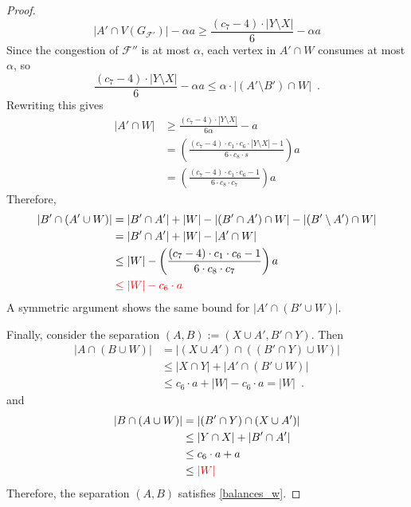 \documentclass{patmorin}
\begin{document}
\begin{proof}
  \[
    |A'\cap V(G_{\mathcal{F}'})| - \alpha a
    \ge \frac{(c_7-4)\cdot |Y\setminus X|}{6} - \alpha a
  \]
  Since the congestion of $\mathcal{F}''$ is at most $\alpha$, each vertex in $A'\cap W$ consumes at most $\alpha$, so
  \[
    \frac{(c_7-4)\cdot |Y\setminus X|}{6} - \alpha a \le \alpha\cdot|(A'\setminus B')\cap W| \enspace .
  \]
  Rewriting this gives
  \begin{align*}
   |A'\cap W|
    & \ge \frac{(c_7-4)\cdot |Y\setminus X|}{6\alpha} - a \\
    & = \left(\frac{(c_7-4)\cdot c_1\cdot c_6\cdot|Y\setminus X|-1}{6\cdot c_8\cdot s}\right)a \\
    & = \left(\frac{(c_7-4)\cdot c_1\cdot c_6-1}{6\cdot c_8\cdot c_7}\right)a
  \end{align*}
  Therefore,
  \begin{align*}
    |B'\cap (A'\cup W)|
    & =  |B'\cap A'| + |W|-|(B'\cap A')\cap W|-|(B'\setminus A')\cap W| \\
    & =  |B'\cap A'| + |W|-|A'\cap W| \\
    & \le |W|- \left(\frac{(c_7-4)\cdot c_1\cdot c_6-1}{6\cdot c_8\cdot c_7}\right)a \\
    & \mathcolor{red}{\le |W|-c_6\cdot a}
  \end{align*}
  A symmetric argument shows the same bound for $|A'\cap (B'\cup W)|$.

  Finally, consider the separation $(A,B):=(X\cup A',B'\cap Y)$.  Then
  \begin{align*}
    |A\cap (B\cup W)|
    & = |(X\cup A')\cap ((B'\cap Y)\cup W)| \\
    & \le |X\cap Y| + |A'\cap (B'\cup W)|\\
    & \le c_6\cdot a + |W| - c_6\cdot a = |W| \enspace .
  \end{align*}
  and
  \begin{align*}
    |B\cap (A\cup W)|
    & = |(B'\cap Y)\cap (X\cup A')| \\
    & \le |Y\cap X| + |B'\cap A'| \\
    & \le c_6\cdot a + a \\
    & \le \mathcolor{red}{|W|}
  \end{align*}
  Therefore, the separation $(A,B)$ satisfies \cref{balances_w}.
\end{proof}
\end{document}
